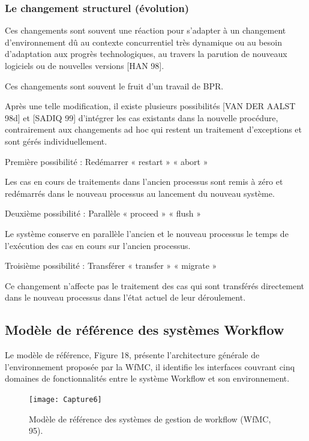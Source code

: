 \subsubsection{Le changement structurel (évolution) }
Ces changements sont souvent une réaction pour s’adapter à un changement
d’environnement dû au contexte concurrentiel très dynamique ou au besoin d’adaptation aux
progrès technologiques, au travers la parution de nouveaux logiciels ou de nouvelles versions
[HAN 98].

Ces changements sont souvent le fruit d’un travail de BPR.

Après une telle modification, il existe plusieurs possibilités [VAN DER AALST 98d] et [SADIQ 99] d’intégrer les cas existants dans la nouvelle procédure, contrairement aux changements ad hoc qui restent un traitement d’exceptions et sont gérés individuellement.

Première possibilité : Redémarrer « restart » « abort »

Les cas en cours de traitements dans l’ancien processus sont remis à zéro et redémarrés
dans le nouveau processus au lancement du nouveau système.

Deuxième possibilité : Parallèle « proceed » « flush »

Le système conserve en parallèle l’ancien et le nouveau processus le temps de l’exécution
des cas en cours sur l’ancien processus.

Troisième possibilité : Transférer « transfer » « migrate »

Ce changement n’affecte pas le traitement des cas qui sont transférés directement dans le
nouveau processus dans l’état actuel de leur déroulement. 



\subsection{Modèle de référence des systèmes Workflow }

Le modèle de référence, Figure 18, présente l’architecture générale de l’environnement
proposée par la WfMC, il identifie les interfaces couvrant cinq domaines de fonctionnalités entre le système Workflow et son environnement. 

\begin{figure}[!h]
	\centering
	\texttt{[image: Capture6]}
	\caption{ Modèle de référence des systèmes de gestion de workflow (WfMC, 95). }
	\label{fig:capture6}
\end{figure}


